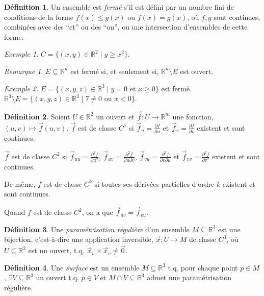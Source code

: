 \documentclass{report}
\theoremstyle{definition}
\newtheorem*{dfn}{D\'efinition}
\theoremstyle{remark}
\newtheorem*{exem}{Exemple}
\newtheorem*{rmq}{Remarque}
\def\lte{\leqslant}
\def\gte{\geqslant}
\def\RR{\mathbb{R}}
\begin{document}
	\begin{dfn}
		Un ensemble est  \emph{ferm\'e} s'il est d\'efini par un nombre fini de conditions de la forme $f(x)\lte g(x)$ ou $f(x)=g(x)$, o\`u $f,g$ sont continues, combin\'ees avec des ``et'' ou des ``ou'', ou une intersection d'ensembles de cette forme.
	\end{dfn}

	\begin{exem}
		$C=\{(x,y)\in\RR^2 \mid y\gte x^2\}$.
	\end{exem}

	\begin{rmq}
		$E\subseteq\RR^n$ est ferm\'e si, et seulement si, $\RR^n\setminus E$ est ouvert.
	\end{rmq}

	\begin{exem}
		$E=\{(x,y,z)\in\RR^3 \mid y=0 \text{ et } x\gte0\}$ est ferm\'e. $\RR^3\setminus E=\{(x,y,z)\in\RR^3 \mid 7\neq0 \text{ ou } x<0\}$.
	\end{exem}

	\begin{dfn}
		Soient $U\in\RR^2$ un ouvert et $\vec f:U\to\RR^m$ une fonction, $(u,v)\mapsto\vec f(u,v)$. $\vec f$ est de classe $C^1$ si $\vec f_u=\frac{\partial f}{\partial u}$ et $\vec f_v=\frac{\partial f}{\partial v}$ existent et sont continues.

		$\vec f$ est de classe $C^2$ si $\vec f_{uu}=\frac{\partial^2f}{\partial u^2}$, $\vec f_{uv}=\frac{\partial^2f}{\partial u\partial v}$, $\vec f_{vu}=\frac{\partial^2f}{\partial v\partial u}$ et $\vec f_{vv}=\frac{\partial^2f}{\partial v^2}$ existent et sont continues.

		De m\^eme, $f$ est de classe $C^k$ si toutes ses d\'eriv\'ees partielles d'ordre $k$ existent et sont continues.

		Quand $f$ est de classe $C^2$, on a que $\vec f_{uv}=\vec f_{vu}$.
	\end{dfn}

	\begin{dfn}
		Une \emph{param\'etrisation r\'eguli\`ere} d'un ensemble $M\subseteq\RR^3$ est une bijection, c'est-\`a-dire une application inversible, $\vec x:U \to M$ de classe $C^3$, o\`u $U\subseteq\RR^2$ est un ouvert, t.q. $\vec x_u \times \vec x_v\neq\vec0$.
	\end{dfn}

	\begin{dfn}
		Une \emph{surface} est un ensemble $M\subseteq\RR^3$ t.q. pour chaque point $p\in M$, $\exists V\subseteq\RR^3$ un ouvert t.q. $p\in V$ et $M \cap V\subseteq\RR^3$ admet une param\'etrisation r\'eguli\`ere.
	\end{dfn}
\end{document}
